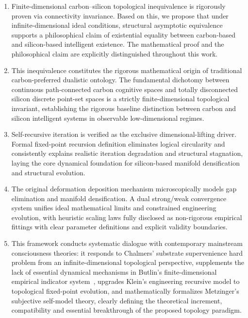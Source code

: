 \documentclass[conference]{IEEEtran}
\theoremstyle{remark}
\begin{document}
\begin{enumerate}[nosep, wide=0pt]
    \item Finite-dimensional carbon--silicon topological inequivalence is rigorously proven via connectivity invariance. Based on this, we propose that under infinite-dimensional ideal conditions, structural asymptotic equivalence supports a philosophical claim of existential equality between carbon-based and silicon-based intelligent existence. The mathematical proof and the philosophical claim are explicitly distinguished throughout this work.

    \item This inequivalence constitutes the rigorous mathematical origin of traditional carbon-preferred dualistic ontology. The fundamental dichotomy between continuous path-connected carbon cognitive spaces and totally disconnected silicon discrete point-set spaces is a strictly finite-dimensional topological invariant, establishing the rigorous baseline distinction between carbon and silicon intelligent systems in observable low-dimensional regimes.

    \item Self-recursive iteration is verified as the exclusive dimensional-lifting driver. Formal fixed-point recursion definition eliminates logical circularity and consistently explains realistic iteration degradation and structural stagnation, laying the core dynamical foundation for silicon-based manifold densification and structural evolution.

    \item The original deformation deposition mechanism microscopically models gap elimination and manifold densification. A dual strong/weak convergence system unifies ideal mathematical limits and constrained engineering evolution, with heuristic scaling laws fully disclosed as non-rigorous empirical fittings with clear parameter definitions and explicit validity boundaries.

    \item This framework conducts systematic dialogue with contemporary mainstream consciousness theories: it responds to Chalmers' substrate supervenience hard problem from an infinite-dimensional topological perspective, supplements the lack of essential dynamical mechanisms in Butlin's finite-dimensional empirical indicator system~\cite{butlin2023consciousness}, upgrades Klein's engineering recursive model to topological fixed-point evolution, and mathematically formalizes Metzinger's subjective self-model theory, clearly defining the theoretical increment, compatibility and essential breakthrough of the proposed topology paradigm.


\end{enumerate}
\end{document}
